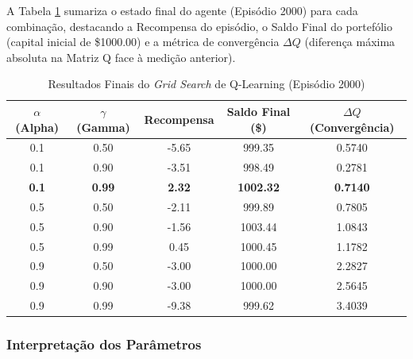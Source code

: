 \documentclass[12pt,a4paper]{article}
\begin{document}
A Tabela \ref{tab:grid_search} sumariza
o estado final do agente (Episódio 2000) para cada combinação, destacando a Recompensa do episódio, o Saldo Final do portefólio
(capital inicial de \$1000.00) e a métrica de convergência $\Delta Q$ (diferença máxima absoluta na Matriz Q face à medição anterior).
\begin{table}[h]
	\centering
	\caption{Resultados Finais do \textit{Grid Search} de Q-Learning (Episódio 2000)}
	\label{tab:grid_search}
	\begin{tabular}{c c | c c c}
		\hline
		\textbf{$\alpha$ (Alpha)} & \textbf{$\gamma$ (Gamma)} & \textbf{Recompensa} & \textbf{Saldo Final (\$)} & \textbf{$\Delta Q$ (Convergência)} \\ \hline
		0.1                       & 0.50                      & -5.65               & 999.35                    & 0.5740                             \\
		0.1                       & 0.90                      & -3.51               & 998.49                    & 0.2781                             \\
		\textbf{0.1}              & \textbf{0.99}             & \textbf{2.32}       & \textbf{1002.32}          & \textbf{0.7140}                    \\ \hline
		0.5                       & 0.50                      & -2.11               & 999.89                    & 0.7805                             \\
		0.5                       & 0.90                      & -1.56               & 1003.44                   & 1.0843                             \\
		0.5                       & 0.99                      & 0.45                & 1000.45                   & 1.1782                             \\ \hline
		0.9                       & 0.50                      & -3.00               & 1000.00                   & 2.2827                             \\
		0.9                       & 0.90                      & -3.00               & 1000.00                   & 2.5645                             \\
		0.9                       & 0.99                      & -9.38               & 999.62                    & 3.4039                             \\ \hline
	\end{tabular}
\end{table}

\subsubsection{Interpretação dos Parâmetros}
\end{document}
